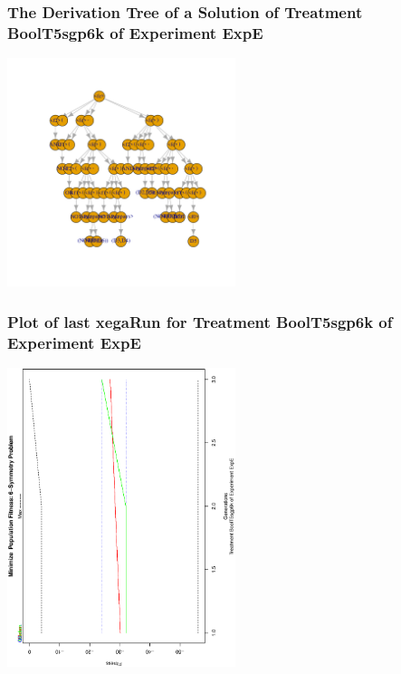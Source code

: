 \documentclass[18pt,c]{beamer}
\begin{document}
 \begin{frame}
 \frametitle{ The Derivation Tree of a Solution of Treatment BoolT5sgp6k of Experiment ExpE }
 \begin{center}
\includegraphics[width=0.5\textwidth, angle=0]
{ExpEDerivationTreeFigure009.pdf}
 \end{center}
 \label{report/ExpEDerivationTreeFigure009.pdf}  
 \end{frame}

 \begin{frame}
 \frametitle{ Plot of last xegaRun for Treatment BoolT5sgp6k of Experiment ExpE }
 \begin{center}
\includegraphics[width=0.5\textwidth, angle=-90]
{ExpEPlotPopStatsFigure009.eps}
 \end{center}
 \label{report/ExpEPlotPopStatsFigure009.eps}  
 \end{frame}
\end{document}
